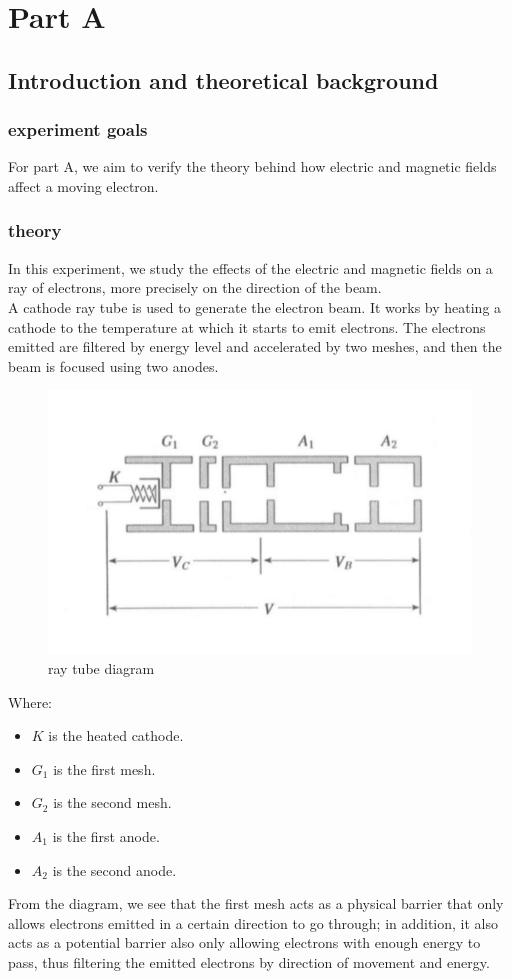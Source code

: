 \documentclass[12pt]{article}
\begin{document}
\tableofcontents

\newpage
\section{Part A }
\subsection{Introduction and theoretical background}
\subsubsection{experiment goals}

For part A, we aim to verify the theory behind how electric and magnetic fields affect a moving electron.

\subsubsection{theory}
In this experiment, we study the effects of the electric and magnetic fields on a ray of electrons, more precisely on the direction of the beam.\\

A cathode ray tube is used to generate the electron beam. It works by heating a cathode to the temperature at which it starts to emit electrons. The electrons emitted are filtered by energy level and accelerated by two meshes, and then the beam is focused using two anodes.

\begin{figure}[h]
    \centering
    \includegraphics[width=0.5\linewidth]{ray gun diagram.png}
    \caption{ray tube diagram}
    \label{fig:CRT}
\end{figure} 
Where:
\begin{itemize}
    \item $K$ is the heated cathode.
    \item $G_1$ is the first mesh.
    \item $G_2$ is the second mesh.
    \item $A_1$ is the first anode. 
    \item $A_2$ is the second anode.
\end{itemize}
\par
From the diagram, we see that the first mesh acts as a physical barrier that only allows electrons emitted in a certain direction to go through; in addition, it also acts as a potential barrier also only allowing electrons with enough energy to pass, thus filtering the emitted electrons by direction of movement and energy. \\
\end{document}
